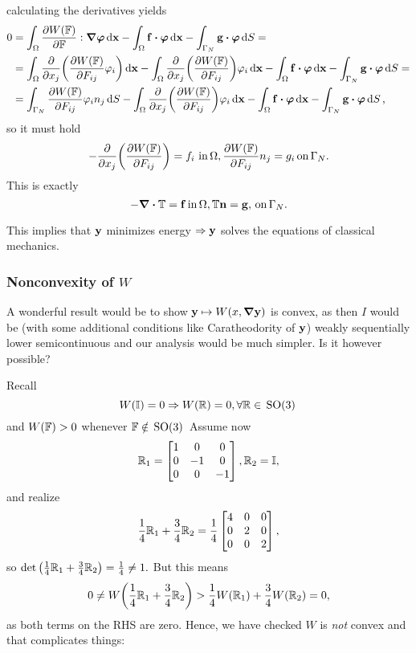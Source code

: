 \documentclass[11pt]{scrartcl} %
\begin{document}
calculating the derivatives yields
\begin{align*}
	0 &= \int_{\Omega}\pdv{W\qty(\fgrad)}{\fgrad}: \grad \vb*{\varphi}\dd{\vb{x}} - \int_{\Omega}\vb{f}\vdot \vb*{\varphi}\dd{\vb{x}} - \int_{\Gamma_N}\vb{g}\vdot \vb*{\varphi}\dd{S} =\\
	  &= \int_{\Omega}\pdv{x_j}\qty(\pdv{W\qty(\fgrad)}{F_{ij}}\varphi_i)\dd{\vb{x}}-\int_{\Omega}\pdv{x_j}\qty(\pdv{W\qty(\fgrad)}{F_{ij}})\varphi_i\dd{\vb{x}}- \int_{\Omega}\vb{f}\vdot \vb*{\varphi}\dd{\vb{x}}-\int_{\Gamma_N}\vb{g}\vdot \vb*{\varphi}\dd{S}= \\
	  & = \int_{\Gamma_N}\pdv{W\qty(\fgrad)}{F_{ij}}\varphi_i n_j \dd{S}-\int_{\Omega}\pdv{x_j}\qty(\pdv{W\qty(\fgrad)}{F_{ij}})\varphi_i\dd{\vb{x}}-\int_{\Omega}\vb{f}\vdot \vb*{\varphi}\dd{\vb{x}} - \int_{\Gamma_N}\vb{g} \vdot \vb*{\varphi}\dd{S},
\end{align*}
so it must hold
\[
	-\pdv{x_j}\qty(\pdv{W\qty(\ensuremath{\mathbb{F}})}{F_{ij}})= f_i \ \text{in} \, \Omega, \pdv{W\qty(\ensuremath{\mathbb{F}})}{F_{ij}}n_j=g_i \, \text{on} \, \Gamma_N.
\]
This is exactly
\[
	-\divergence{\pkstress} = \vb{f} \, \text{in} \,\Omega, \pkstress \vb{n} = \vb{g}, \, \text{on} \, \Gamma_N.
\]

This implies that $\vb{y}$ minimizes energy $\Rightarrow \vb{y}$ solves the equations of classical mechanics.


\subsubsection{Nonconvexity of $W$}
\label{sec:nonconvexity}
A wonderful result would be to show $\vb{y} \mapsto W\qty(x, \grad \vb{y})$ is convex, as then $I$ would be (with some additional conditions like Caratheodority of $\vb{y}$) weakly sequentially lower semicontinuous and our analysis would be much simpler. Is it however possible?

Recall
\[
	W\qty(\mathbb{I}) = 0 \Rightarrow W\qty(\mathbb{R})=0, \forall \mathbb{R}\in \, \text{SO(3)} \,
\]
and $W\qty(\mathbb{F})>0$ whenever $\mathbb{F} \notin \, \text{SO(3)} \,$
Assume now
\[
	\mathbb{R}_1 = \begin{bmatrix} 1 & 0 & 0\\ 0 & -1 & 0\\ 0 & 0 & -1 \end{bmatrix}, \mathbb{R}_2 = \mathbb{I},
\]
and realize
\[
	\frac{1}{4} \mathbb{R}_1 + \frac{3}{4}\mathbb{R}_2 =\frac{1}{4} \begin{bmatrix} 4 & 0 &0 \\ 0 & 2 & 0 \\ 0 & 0 & 2 \end{bmatrix},
\]
so $\det \qty(\frac{1}{4} \mathbb{R}_1 + \frac{3}{4} \mathbb{R}_2) = \frac{1}{4} \neq 1.$
But this means
\[
	0 \neq W\qty(\frac{1}{4}\mathbb{R}_1+\frac{3}{4}\mathbb{R}_2)>\frac{1}{4}W\qty(\mathbb{R}_1)+\frac{3}{4}W\qty(\mathbb{R}_2)=0,
\]
as both terms on the RHS are zero. Hence, we have checked $W$ is \textit{not} convex and that complicates things:
\end{document}

